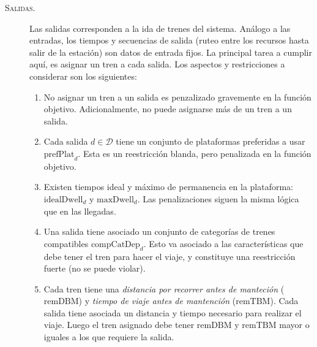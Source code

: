 \documentclass[letter, 10pt]{article}
\begin{document}
\begin{description}
	\item[\textsc{Salidas.}]
	Las salidas corresponden a la ida de trenes del sistema. Análogo a las entradas, los tiempos y secuencias de
	salida (ruteo entre los recursos hasta salir de la estación) son datos de entrada fijos. La principal tarea a
	cumplir aquí, es asignar un tren a cada salida. Los aspectos y restricciones a considerar son los siguientes:
	\begin{enumerate}
		\item No asignar un tren a un salida es penzalizado gravemente en la función objetivo. Adicionalmente, no
		puede asignarse más de un tren a un salida.
		\item Cada salida $d \in \mathcal{D}$ tiene un conjunto de plataformas preferidas a usar $\text{prefPlat}_d$.
		Esta es un reestricción blanda, pero penalizada en la función objetivo.
		\item Existen tiempos ideal y máximo de permanencia en la plataforma: $\text{idealDwell}_d$ y $\text{maxDwell}_d$.
		Las penalizaciones siguen la misma lógica que en las llegadas.
		\item Una salida tiene asociado un conjunto de categorías de trenes compatibles $\text{compCatDep}_d$. Esto va asociado a las características que debe tener el tren para hacer el viaje, y constituye una reestricción fuerte
		(no se puede violar).
		\item Cada tren tiene una \textit{distancia por recorrer antes de manteción} ($\text{remDBM}$) y \textit{tiempo de viaje antes de mantención} ($\text{remTBM}$). Cada salida tiene asociada un distancia y tiempo necesario para realizar el viaje. Luego el tren asignado debe tener $\text{remDBM}$ y $\text{remTBM}$ mayor o iguales a los que requiere la salida.

	\end{enumerate}


\end{description}
\end{document}
